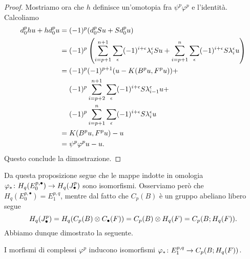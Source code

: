 \begin{proof}
Mostriamo ora che $h$ definisce un'omotopia fra $\psi^p\varphi^p$ e l'identità. Calcoliamo
\begin{align*}
d^p_0hu+hd^p_0u&=(-1)^p(d^p_0Su+Sd^p_0u)\\
&=(-1)^p\left(\sum_{i=p+1}^{n+1}\sum_\epsilon(-1)^{i+\epsilon}\lambda^\epsilon_iSu+\sum_{i=p+1}^n\sum_\epsilon(-1)^{i+\epsilon}S\lambda^\epsilon_iu\right)\\
&=(-1)^p(-1)^{p+1}(u-K(B^pu,F^pu))+\\
&\phantomop(-1)^p\sum_{i=p+2}^{n+1}\sum_\epsilon(-1)^{i+\epsilon}S\lambda^\epsilon_{i-1}u+\\
&\phantomop(-1)^p\sum_{i=p+1}^n\sum_\epsilon(-1)^{i+\epsilon}S\lambda^\epsilon_iu\\
&=K(B^pu,F^pu)-u\\
&=\psi^p\varphi^pu-u.
\end{align*}
Questo conclude la dimostrazione.
\end{proof}

Da questa proposizione segue che le mappe indotte in omologia $\varphi_*\colon H_q(E^{p,\bullet}_0)\to H_q(J^p_\bullet)$ sono isomorfismi. Osserviamo però che $H_q(E^{p,\bullet}_0)=E^{p,q}_1$, mentre dal fatto che $C_p(B)$ è un gruppo abeliano libero segue
$$
H_q(J^p_\bullet)=H_q(C_p(B)\mathbin{\otimes} C_\bullet(F))=C_p(B)\mathbin{\otimes} H_q(F)=C_p(B;H_q(F)).
$$
Abbiamo dunque dimostrato la seguente.
\begin{proposition}
I morfismi di complessi $\varphi^p$ inducono isomorfismi $\varphi_*\colon E^{p,q}_1\to C_p(B;H_q(F))$.
\end{proposition}

